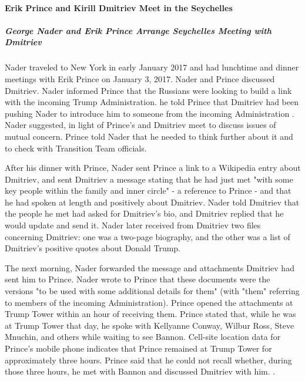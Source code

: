 \paragraph{Erik Prince and Kirill Dmitriev Meet in the Seychelles}

\subparagraph{George Nader and Erik Prince Arrange Seychelles Meeting with Dmitriev}

Nader traveled to New York in early January 2017 and had lunchtime and dinner meetings with Erik Prince on January 3, 2017.%
Nader and Prince discussed Dmitriev.%
Nader informed Prince that the Russians were looking to build a link with the incoming Trump Administration.%
he told Prince that Dmitriev had been pushing Nader to introduce him to someone from the incoming Administration
.%
Nader suggested, in light of Prince's and Dmitriev meet to discuss issues of mutual concern.%
Prince told Nader that he needed to think further about it and to check with Transition Team officials.%

After his dinner with Prince, Nader sent Prince a link to a Wikipedia entry about Dmitriev, and sent Dmitriev a message stating that he had just met "with some key people within the family and inner circle" - a reference to Prince - and that he had spoken at length and positively about Dmitriev.%
Nader told Dmitriev that the people he met had asked for Dmitriev's bio, and Dmitriev replied that he would update and send it.%
Nader later received from Dmitriev two files concerning Dmitriev: one was a two-page biography, and the other was a list of Dmitriev's positive quotes about Donald Trump.%

The next morning, Nader forwarded the message and attachments Dmitriev had sent him to Prince.%
Nader wrote to Prince that these documents were the versions "to be used with some additional details for them" (with "them" referring to members of the incoming Administration).%
Prince opened the attachments at Trump Tower within an hour of receiving them.%
Prince stated that, while he was at Trump Tower that day, he spoke with Kellyanne Conway, Wilbur Ross, Steve Mnuchin, and others while waiting to see Bannon.%
Cell-site location data for Prince's mobile phone indicates that Prince remained at Trump Tower for approximately three hours.%
Prince said that he could not recall whether, during those three hours, he met with Bannon and discussed Dmitriev with him.%
.%

